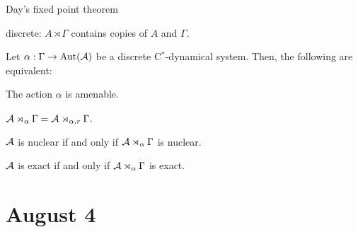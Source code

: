 \documentclass{../../small}
\begin{document}
Day's fixed point theorem

discrete: $A\rtimes\Gamma$ contains copies of $A$ and $\Gamma$.

\begin{thm}
Let $\alpha:\Gamma\to\operatorname{Aut}(\mathcal{A})$ be a discrete C$^*$-dynamical system.
Then, the following are equivalent:
\begin{parts}
\item The action $\alpha$ is amenable.
\item $\mathcal{A}\rtimes_\alpha\Gamma=\mathcal{A}\rtimes_{\alpha,r}\Gamma$.
\item $\mathcal{A}$ is nuclear if and only if $\mathcal{A}\rtimes_\alpha\Gamma$ is nuclear.
\item $\mathcal{A}$ is exact if and only if $\mathcal{A}\rtimes_\alpha\Gamma$ is exact.
\end{parts}
\end{thm}




\newpage
\section{August 4}
\end{document}

